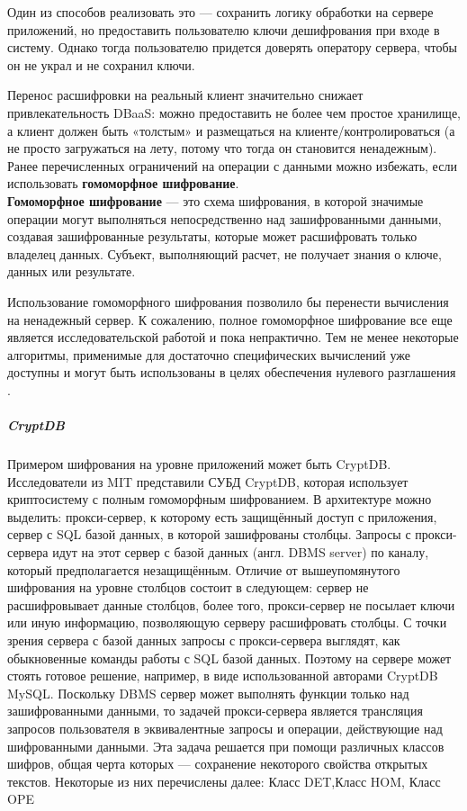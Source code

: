 Один из способов реализовать это — сохранить логику обработки на сервере приложений, но
предоставить пользователю ключи дешифрования при входе в систему. Однако тогда пользователю
придется доверять оператору сервера, чтобы он не украл и не сохранил ключи.

Перенос расшифровки на реальный клиент значительно снижает привлекательность DBaaS: можно
предоставить не более чем простое хранилище, а клиент должен быть «толстым» и размещаться на
клиенте/контролироваться (а не просто загружаться на лету, потому что тогда он становится
ненадежным). \\

Ранее перечисленных ограничений на операции с данными можно избежать, если использовать
\textbf{гомоморфное шифрование}. \\

\textbf{Гомоморфное шифрование} — это схема шифрования, в которой значимые операции могут выполняться
непосредственно над зашифрованными данными, создавая зашифрованные результаты, которые может
расшифровать только владелец данных. Субъект, выполняющий расчет, не получает знания о ключе,
данных или результате.

Использование гомоморфного шифрования позволило бы перенести вычисления на ненадежный сервер.
К сожалению, полное гомоморфное шифрование все еще является исследовательской работой и пока
непрактично. Тем не менее некоторые алгоритмы, применимые для достаточно специфических вычислений
уже доступны и могут быть использованы в целях обеспечения нулевого разглашения \cite{zkd}.

\subparagraph{CryptDB}

Примером шифрования на уровне приложений может быть CryptDB. Исследователи из MIT представили СУБД CryptDB, которая использует криптосистему с полным гомоморфным шифрованием. В архитектуре можно выделить: прокси-сервер, к которому есть защищённый доступ с приложения, сервер с SQL базой данных, в которой зашифрованы столбцы. Запросы с прокси-сервера идут на этот сервер с базой данных (англ. DBMS server) по каналу, который предполагается незащищённым. Отличие от вышеупомянутого шифрования на уровне столбцов состоит в следующем: сервер не расшифровывает данные столбцов, более того, прокси-сервер не посылает ключи или иную информацию, позволяющую серверу расшифровать столбцы. С точки зрения сервера с базой данных запросы с прокси-сервера выглядят, как обыкновенные команды работы с SQL базой данных. Поэтому на сервере может стоять готовое решение, например, в виде использованной авторами CryptDB MySQL. Поскольку DBMS сервер может выполнять функции только над зашифрованными данными, то задачей прокси-сервера является трансляция запросов пользователя в эквивалентные запросы и операции, действующие над шифрованными данными. Эта задача решается при помощи различных классов шифров, общая черта которых — сохранение некоторого свойства открытых текстов. Некоторые из них перечислены далее: Класс DET,Класс HOM, Класс OPE \cite{CryptDB}\cite{MIT-CryptDB}

